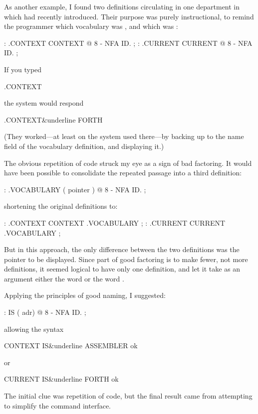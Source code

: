 As another example, I found two definitions circulating in one
department in which \Forth{} had recently introduced. Their purpose
was purely instructional, to remind the programmer which vocabulary
was , and which was :

\begin{Code}
: .CONTEXT   CONTEXT @  8 -  NFA  ID.   ;
: .CURRENT   CURRENT @  8 -  NFA  ID.  ;
\end{Code}
\goodbreak
\noindent If you typed

\begin{Code}
.CONTEXT
\end{Code}
the system would respond

\begin{Code}[commandchars=\&\{\}]
.CONTEXT&underline{ FORTH}
\end{Code}
(They worked---at least on the system used there---by backing up to the
name field of the vocabulary definition, and displaying it.)

The obvious repetition of code struck my eye as a sign of bad
factoring. It would have been possible to consolidate the repeated
passage into a third definition:

\begin{Code}
: .VOCABULARY   ( pointer )  @  8 -  NFA  ID. ;
\end{Code}
shortening the original definitions to:

\begin{Code}
: .CONTEXT   CONTEXT .VOCABULARY ;
: .CURRENT   CURRENT .VOCABULARY ;
\end{Code}
But in this approach, the only difference between the two definitions
was the pointer to be displayed. Since part of good factoring is to
make fewer, not more definitions, it seemed logical to have only one
definition, and let it take as an argument either the word
 or the word .

Applying the principles of good naming, I suggested:

\begin{Code}
: IS  ( adr)   @  8 -  NFA  ID. ;
\end{Code}
allowing the syntax

\begin{Code}[commandchars=\&\{\}]
CONTEXT IS&underline{ ASSEMBLER ok}
\end{Code}
or

\begin{Code}[commandchars=\&\{\}]
CURRENT IS&underline{ FORTH ok}
\end{Code}
The initial clue was repetition of code, but the final result came
from attempting to simplify the command interface.

